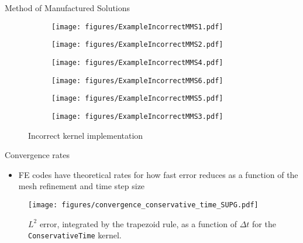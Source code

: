 \documentclass{beamer}
\begin{document}

\begin{frame}{Method of Manufactured Solutions}

\begin{figure}[H]
\centering
\begin{subfigure}{.25\textwidth}
  \centering
  \texttt{[image: figures/ExampleIncorrectMMS1.pdf]}
\end{subfigure}
\begin{subfigure}{.25\textwidth}
  \centering
  \texttt{[image: figures/ExampleIncorrectMMS2.pdf]}
\end{subfigure}
\begin{subfigure}{.25\textwidth}
  \centering
  \texttt{[image: figures/ExampleIncorrectMMS4.pdf]}
\end{subfigure}
\begin{subfigure}{.25\textwidth}
  \centering
  \texttt{[image: figures/ExampleIncorrectMMS6.pdf]}
\end{subfigure}
\begin{subfigure}{.25\textwidth}
  \centering
  \texttt{[image: figures/ExampleIncorrectMMS5.pdf]}
\end{subfigure}
  \begin{subfigure}{.25\textwidth}
  \centering
  \texttt{[image: figures/ExampleIncorrectMMS3.pdf]}
\end{subfigure}
\caption{Incorrect kernel implementation}
\end{figure}

\end{frame}


\begin{frame}{Convergence rates}

\begin{itemize}
\item FE codes have theoretical rates for how fast error reduces as a function of the mesh refinement and time step size
\end{itemize}

\begin{figure}[H]
  \centering
  \texttt{[image: figures/convergence\_conservative\_time\_SUPG.pdf]}
  \caption{\(L^2\) error, integrated by the trapezoid rule, as a function of \(\Delta t\) for the \texttt{ConservativeTime} kernel.}
  \label{fig:convergence_conservative_time_SUPG}
\end{figure}

\end{frame}
\end{document}
